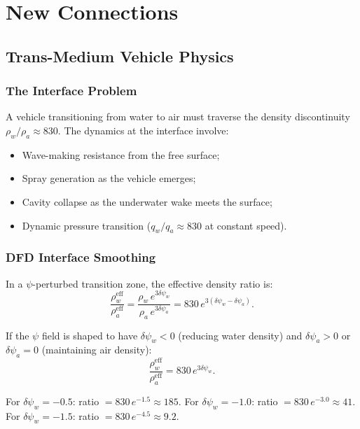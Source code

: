 \documentclass[12pt,twocolumn]{article}
\newcommand{\Reff}{\mathrm{eff}}
\newcommand{\dpsi}{\delta\psi}
\begin{document}
\section{New Connections}
\label{sec:new_connections}

\subsection{Trans-Medium Vehicle Physics}
\label{sec:trans_medium}

\subsubsection{The Interface Problem}

A vehicle transitioning from water to air must traverse the density
discontinuity $\rho_w/\rho_a \approx 830$. The dynamics at the interface
involve:
\begin{itemize}[noitemsep]
\item Wave-making resistance from the free surface;
\item Spray generation as the vehicle emerges;
\item Cavity collapse as the underwater wake meets the surface;
\item Dynamic pressure transition ($q_w/q_a \approx 830$ at constant speed).
\end{itemize}

\subsubsection{DFD Interface Smoothing}

In a $\psi$-perturbed transition zone, the effective density ratio is:
\begin{equation}
\frac{\rho_w^\Reff}{\rho_a^\Reff}
= \frac{\rho_w\,e^{3\dpsi_w}}{\rho_a\,e^{3\dpsi_a}}
= 830\,e^{3(\dpsi_w - \dpsi_a)}.
\end{equation}

If the $\psi$ field is shaped to have $\dpsi_w < 0$ (reducing water
density) and $\dpsi_a > 0$ or $\dpsi_a = 0$ (maintaining air density):
\begin{equation}
\frac{\rho_w^\Reff}{\rho_a^\Reff} = 830\,e^{3\dpsi_w}.
\end{equation}

For $\dpsi_w = -0.5$: ratio $= 830\,e^{-1.5} \approx 185$.
For $\dpsi_w = -1.0$: ratio $= 830\,e^{-3.0} \approx 41$.
For $\dpsi_w = -1.5$: ratio $= 830\,e^{-4.5} \approx 9.2$.
\end{document}
